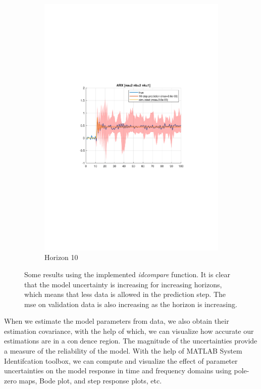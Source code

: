 \documentclass[]{article}
\begin{document}
\begin{figure}[ht]
\begin{subfigure}{.30\textwidth}
	\includegraphics[trim= 10cm 8cm 10cm 8cm, scale=0.3]{figures/1d-horizon_10.pdf}
	\caption{Horizon 10}
	\label{fig:1d-horizon10}
\end{subfigure}
\caption{Some results using the implemented \emph{idcompare} function. It is clear that the model uncertainty is increasing for increasing horizons, which means that less data is allowed in the prediction step. The mse on validation data is also increasing as the horizon is increasing.}
\label{fig:1d}
\end{figure}

When we estimate the model parameters from data, we also obtain their estimation covariance, with the help of which, we can visualize how accurate our estimations are in a condence region. The magnitude of the uncertainties provide a measure of the reliability of the model. With the help of MATLAB System Identifcation toolbox, we can compute and visualize the effect of parameter uncertainties on the model response in time and frequency domains using pole-zero maps, Bode plot, and step response plots, etc.
\end{document}
